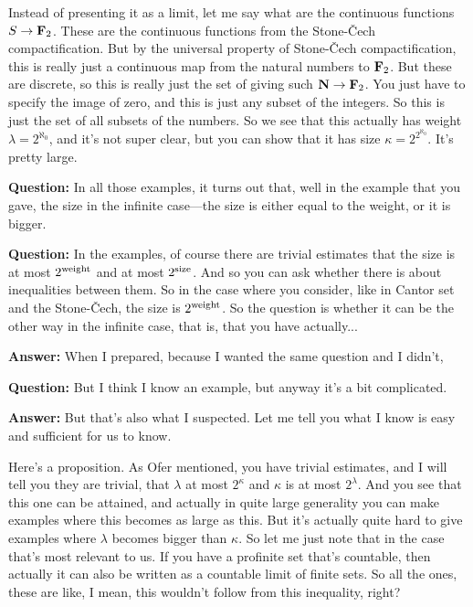 \begin{example}
Instead of presenting it as a limit, let me say what are the continuous functions $S \to \mathbf F_2$. These are the continuous functions from the Stone-Čech compactification. But by the universal property of Stone-Čech compactification, this is really just a continuous map from the natural numbers to $\mathbf F_2$. But these are discrete, so this is really just the set of giving such $\mathbf N \to \mathbf F_2$. You just have to specify the image of zero, and this is just any subset of the integers. So this is just the set of all subsets of the numbers.
So we see that this actually has weight $\lambda = 2^{\aleph_0}$, and it's not super clear, but you can show that it has size $\kappa = 2^{2^{\aleph_0}}$. It's pretty large. 

\textbf{Question:} In all those examples, it turns out that, well in the example that you gave, the size in the infinite case---the size is either equal to the weight, or it is bigger.


\textbf{Question:} In the examples, of course there are trivial estimates that the size is at most $2^{\mathrm{weight}}$ and at most $2^{\mathrm{size}}$. And so you can ask whether there is about inequalities between them. So in the case where you consider, like in Cantor set and the Stone-Čech, the size is $2^{\mathrm{weight}}$. So the question is whether it can be the other way in the infinite case, that is, that you have actually...
 
\textbf{Answer:} When I prepared, because I wanted the same question and I didn't, 

\textbf{Question:} But I think I know an example, but anyway it's a bit complicated. 

\textbf{Answer:} But that's also what I suspected.
Let me tell you what I know is easy and sufficient for us to know. 

\begin{proposition}

Here's a proposition. As Ofer mentioned, you have trivial estimates, and I will tell you they are trivial, that $\lambda$ at most $2^{\kappa}$ and $\kappa$ is at most $2^{\lambda}$. And you see that this one can be attained, and actually in quite large generality you can make examples where this becomes as large as this. 
But it's actually quite hard to give examples where $\lambda$ becomes bigger than $\kappa$.
So let me just note that in the case that's most relevant to us. 
If you have a profinite set that's countable, then actually it can also be written as a countable limit of finite sets. So all the ones, these are like, I mean, this wouldn't follow from this inequality, right?


\end{proposition}
\end{example}
